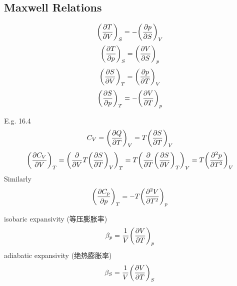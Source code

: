 \documentclass[UTF8]{ctexart} %
\numberwithin{equation}{subsection}
\begin{document}
\subsection{}

\subsection{Maxwell Relations}
\begin{equation}\label{key}
\qty(\pdv{T}{V})_S = -\qty(\pdv{p}{S})_V
\end{equation}
\begin{equation}\label{key}
\qty(\pdv{T}{p})_S = \qty(\pdv{V}{S})_p
\end{equation}
\begin{equation}\label{key}
\qty(\pdv{S}{V})_T = \qty(\pdv{p}{T})_V
\end{equation}
\begin{equation}\label{key}
\qty(\pdv{S}{p})_T = -\qty(\pdv{V}{T})_p
\end{equation}

E.g. 16.4
\begin{equation}\label{key}
C_V = \qty(\pdv{Q}{T})_V = T\qty(\pdv{S}{T})_V
\end{equation}
\begin{equation}\label{key}
\qty(\pdv{C_V}{V})_T = \qty(\pdv{V}T\qty(\pdv{S}{T})_V)_T = T\qty(\pdv{T}\qty(\pdv{S}{V})_T)_V = T\qty(\pdv[2]{p}{T})_V
\end{equation}
Similarly
\begin{equation}\label{key}
\qty(\pdv{C_p}{p})_T = -T\qty(\pdv[2]{V}{T})_p
\end{equation}

isobaric expansivity (等压膨胀率)
\begin{equation}\label{key}
\beta_p = \dfrac{1}{V}\qty(\pdv{V}{T})_p
\end{equation}
adiabatic expansivity (绝热膨胀率)
\begin{equation}\label{key}
\beta_S = \dfrac{1}{V}\qty(\pdv{V}{T})_S
\end{equation}
\end{document}
